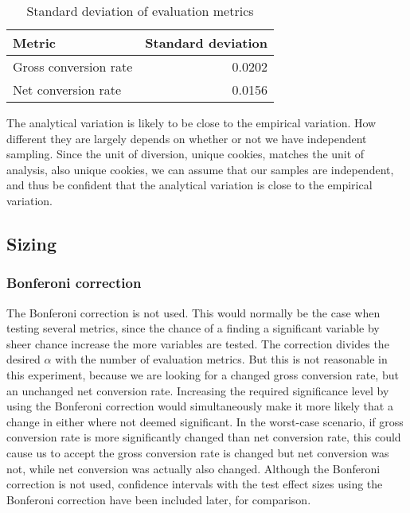 \documentclass[12pt]{article}
\begin{document}
\begin{table}[ht]
\centering
\caption{Standard deviation of evaluation metrics}
\label{tbl:variation}
\begin{tabular}{@{}lr@{}}
\toprule
\textbf{Metric} & \textbf{Standard deviation} \\
\midrule
Gross conversion rate 	&	0.0202	\\
Net conversion rate 		& 0.0156  \\
\bottomrule
\end{tabular}
\end{table}

The analytical variation is likely to be close to the empirical variation. How different they are largely depends on whether or not we have independent sampling. Since the unit of diversion, unique cookies, matches the unit of analysis, also unique cookies, we can assume that our samples are independent, and thus be confident that the analytical variation is close to the empirical variation.

\subsection{Sizing}
\subsubsection{Bonferoni correction}
The Bonferoni correction is not used. This would normally be the case when testing several metrics, since the chance of a finding a significant variable by sheer chance increase the more variables are tested. The correction divides the desired $\alpha$ with the number of evaluation metrics. But this is not reasonable in this experiment, because we are looking for a changed gross conversion rate, but an unchanged net conversion rate. Increasing the required significance level by using the Bonferoni correction would simultaneously make it more likely that a change in either where not deemed significant. In the worst-case scenario, if gross conversion rate is more significantly changed than net conversion rate, this could cause us to accept the gross conversion rate is changed but net conversion was not, while net conversion was actually also changed.
\newline
Although the Bonferoni correction is not used, confidence intervals with the test effect sizes using the Bonferoni correction have been included later, for comparison.
\end{document}
